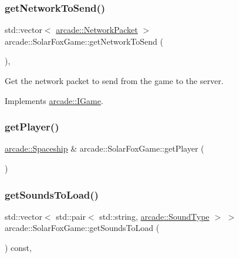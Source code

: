 \subsubsection{\texorpdfstring{get\+Network\+To\+Send()}{getNetworkToSend()}}
{\footnotesize\ttfamily std\+::vector$<$ \hyperlink{structarcade_1_1_network_packet}{arcade\+::\+Network\+Packet} $>$ arcade\+::\+Solar\+Fox\+Game\+::get\+Network\+To\+Send (\begin{DoxyParamCaption}{ }\end{DoxyParamCaption})\hspace{0.3cm}{\ttfamily [override]}, {\ttfamily [virtual]}}



Get the network packet to send from the game to the server. 



Implements \hyperlink{classarcade_1_1_i_game_a5aa80dfdb3c1881fbc749e3d53efc6f8}{arcade\+::\+I\+Game}.

\mbox{\label{classarcade_1_1_solar_fox_game_a75c60a8ae25175073200318d3d2072fd}} 
\subsubsection{\texorpdfstring{get\+Player()}{getPlayer()}}
{\footnotesize\ttfamily \hyperlink{classarcade_1_1_spaceship}{arcade\+::\+Spaceship} \& arcade\+::\+Solar\+Fox\+Game\+::get\+Player (\begin{DoxyParamCaption}{ }\end{DoxyParamCaption})}

\mbox{\label{classarcade_1_1_solar_fox_game_aed75a8fdc63d9162359ada5332b44331}} 
\subsubsection{\texorpdfstring{get\+Sounds\+To\+Load()}{getSoundsToLoad()}}
{\footnotesize\ttfamily std\+::vector$<$ std\+::pair$<$ std\+::string, \hyperlink{namespacearcade_a3bb4743a2eea59f3927e404e6549cae5}{arcade\+::\+Sound\+Type} $>$ $>$ arcade\+::\+Solar\+Fox\+Game\+::get\+Sounds\+To\+Load (\begin{DoxyParamCaption}{ }\end{DoxyParamCaption}) const\hspace{0.3cm}{\ttfamily [override]}, {\ttfamily [virtual]}}



